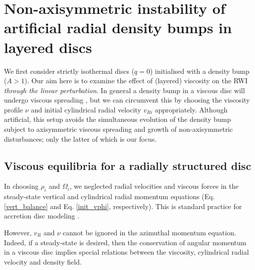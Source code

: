\section{Non-axisymmetric instability of artificial {\bf radial} density bumps in
  layered discs}\label{density_bump} 
We first consider strictly isothermal discs ($q=0$) initialised with a
density bump ($A>1$). Our aim here
is to examine the effect of (layered) viscosity on the RWI 
\emph{through the linear perturbation}. 
In general a density bump in a viscous disc will undergo viscous
spreading \citep{lyndenbell74}, but we can circumvent this 
by choosing the viscosity profile $\nu$ and initial cylindrical radial
velocity $v_{Ri}$ appropriately. 
Although artificial, this setup avoids 
the simultaneous evolution of the density bump subject to
axisymmetric viscous spreading and growth of
non-axisymmetric disturbances; only the latter of which is our focus. 


\subsection{Viscous equilibria for a radially structured
  disc}\label{visc_eq}  
In choosing $\rho_i$ and $\Omega_i$, we neglected radial
velocities and viscous forces in the steady-state vertical and
cylindrical radial momentum equations (Eq. \ref{vert_balance} and
Eq. \ref{init_vphi}, respectively). This is standard practice for
accretion disc modeling \citep[e.g.][]{takeuchi02}.   

However, $v_{R}$ and $\nu$ cannot be ignored in the azimuthal
momentum equation. Indeed, if a steady-state is desired, then the
conservation of angular momentum in a viscous disc implies special
relations between the viscosity, cylindrical radial velocity and
density field. 

